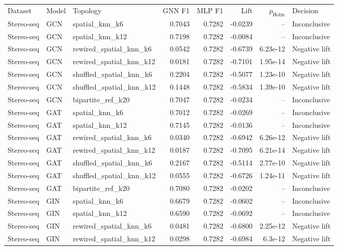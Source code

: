 \begin{longtable}{lllrrrrl}
Dataset & Model & Topology & GNN F1 & MLP F1 & Lift & $p_{\mathrm{Holm}}$ & Decision \\
Stereo-seq & GCN & spatial\_knn\_k6 & 0.7043 & 0.7282 & -0.0239 & -- & Inconclusive \\
Stereo-seq & GCN & spatial\_knn\_k12 & 0.7198 & 0.7282 & -0.0084 & -- & Inconclusive \\
Stereo-seq & GCN & rewired\_spatial\_knn\_k6 & 0.0542 & 0.7282 & -0.6739 & 6.23e-12 & Negative lift \\
Stereo-seq & GCN & rewired\_spatial\_knn\_k12 & 0.0181 & 0.7282 & -0.7101 & 1.95e-14 & Negative lift \\
Stereo-seq & GCN & shuffled\_spatial\_knn\_k6 & 0.2204 & 0.7282 & -0.5077 & 1.23e-10 & Negative lift \\
Stereo-seq & GCN & shuffled\_spatial\_knn\_k12 & 0.1448 & 0.7282 & -0.5834 & 1.39e-10 & Negative lift \\
Stereo-seq & GCN & bipartite\_ref\_k20 & 0.7047 & 0.7282 & -0.0234 & -- & Inconclusive \\
Stereo-seq & GAT & spatial\_knn\_k6 & 0.7012 & 0.7282 & -0.0269 & -- & Inconclusive \\
Stereo-seq & GAT & spatial\_knn\_k12 & 0.7145 & 0.7282 & -0.0136 & -- & Inconclusive \\
Stereo-seq & GAT & rewired\_spatial\_knn\_k6 & 0.0340 & 0.7282 & -0.6942 & 6.26e-12 & Negative lift \\
Stereo-seq & GAT & rewired\_spatial\_knn\_k12 & 0.0187 & 0.7282 & -0.7095 & 6.21e-14 & Negative lift \\
Stereo-seq & GAT & shuffled\_spatial\_knn\_k6 & 0.2167 & 0.7282 & -0.5114 & 2.77e-10 & Negative lift \\
Stereo-seq & GAT & shuffled\_spatial\_knn\_k12 & 0.0555 & 0.7282 & -0.6726 & 1.24e-11 & Negative lift \\
Stereo-seq & GAT & bipartite\_ref\_k20 & 0.7080 & 0.7282 & -0.0202 & -- & Inconclusive \\
Stereo-seq & GIN & spatial\_knn\_k6 & 0.6679 & 0.7282 & -0.0602 & -- & Inconclusive \\
Stereo-seq & GIN & spatial\_knn\_k12 & 0.6590 & 0.7282 & -0.0692 & -- & Inconclusive \\
Stereo-seq & GIN & rewired\_spatial\_knn\_k6 & 0.0481 & 0.7282 & -0.6800 & 2.25e-12 & Negative lift \\
Stereo-seq & GIN & rewired\_spatial\_knn\_k12 & 0.0298 & 0.7282 & -0.6984 & 6.3e-12 & Negative lift \\

\end{longtable}
